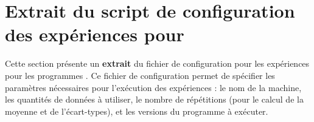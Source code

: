 \chapter{Extrait du script de configuration des expériences pour }

\label{ExperiencesPreliminairesWordCount.ann}

Cette section pr\'esente un \textbf{extrait} du fichier de
configuration pour les expériences pour les programmes
. Ce fichier de configuration permet de sp\'ecifier les
param\`etres nécessaires pour l'ex\'ecution des exp\'eriences : le nom
de la machine, les quantit\'es de donn\'ees à utiliser, le nombre de
r\'ep\'etitions (pour le calcul de la moyenne et de l'écart-types), et
les versions du programme \`a ex\'ecuter.


\pagebreak







